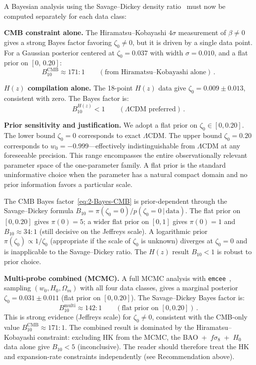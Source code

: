 A Bayesian analysis using the Savage--Dickey density ratio~\cite{ch2:Dickey1971} must now be computed separately for each data class:

\textbf{CMB constraint alone.} The Hiramatsu--Kobayashi $4\sigma$ measurement of $\beta \neq 0$ gives a strong Bayes factor favoring $\zeta_0 \neq 0$, but it is driven by a single data point. For a Gaussian posterior centered at $\zeta_0 = 0.037$ with width $\sigma = 0.010$, and a flat prior on $[0,\,0.20]$:
\begin{equation}
B_{10}^\mathrm{CMB} \approx 171{:}1 \qquad (\text{from Hiramatsu--Kobayashi alone})\,.
\label{eq:2-Bayes-CMB}
\end{equation}

\textbf{$H(z)$ compilation alone.} The 18-point $H(z)$ data give $\zeta_0 = 0.009 \pm 0.013$, consistent with zero. The Bayes factor is:
\begin{equation}
B_{10}^{H(z)} < 1 \qquad (\Lambda\text{CDM preferred})\,.
\label{eq:2-Bayes-Hz}
\end{equation}

\textbf{Prior sensitivity and justification.} We adopt a flat prior on $\zeta_0 \in [0, 0.20]$. The lower bound $\zeta_0 = 0$ corresponds to exact $\Lambda$CDM. The upper bound $\zeta_0 = 0.20$ corresponds to $w_0 = -0.999$---effectively indistinguishable from $\Lambda$CDM at any foreseeable precision. This range encompasses the entire observationally relevant parameter space of the one-parameter family. A flat prior is the standard uninformative choice when the parameter has a natural compact domain and no prior information favors a particular scale.

The CMB Bayes factor~\eqref{eq:2-Bayes-CMB} is prior-dependent through the Savage--Dickey formula $B_{10} = \pi(\zeta_0{=}0)/p(\zeta_0{=}0\,|\,\mathrm{data})$.  The flat prior on $[0, 0.20]$ gives $\pi(0) = 5$; a wider flat prior on $[0, 1]$ gives $\pi(0) = 1$ and $B_{10} \approx 34{:}1$ (still decisive on the Jeffreys scale).  A logarithmic prior $\pi(\zeta_0) \propto 1/\zeta_0$ (appropriate if the scale of $\zeta_0$ is unknown) diverges at $\zeta_0 = 0$ and is inapplicable to the Savage--Dickey ratio.  The $H(z)$ result $B_{10} < 1$ is robust to prior choice.

\textbf{Multi-probe combined (MCMC).} A full MCMC analysis with \texttt{emcee}~\cite{ch2:ForemanMackey2013}, sampling $(w_0, H_0, \Omega_m)$ with all four data classes, gives a marginal posterior $\zeta_0 = 0.031 \pm 0.011$ (flat prior on $[0, 0.20]$). The Savage--Dickey Bayes factor is:
\begin{equation}
B_{10}^\mathrm{multi} \approx 142{:}1 \qquad (\text{flat prior on } [0, 0.20])\,.
\label{eq:2-Bayes-multi}
\end{equation}
This is strong evidence (Jeffreys scale) for $\zeta_0 \neq 0$, consistent with the CMB-only value $B_{10}^\mathrm{CMB} \approx 171{:}1$. The combined result is dominated by the Hiramatsu--Kobayashi constraint: excluding HK from the MCMC, the BAO~+~$f\sigma_8$~+~$H_0$ data alone give $B_{10} < 5$ (inconclusive). The reader should therefore treat the HK and expansion-rate constraints independently (see Recommendation above).

